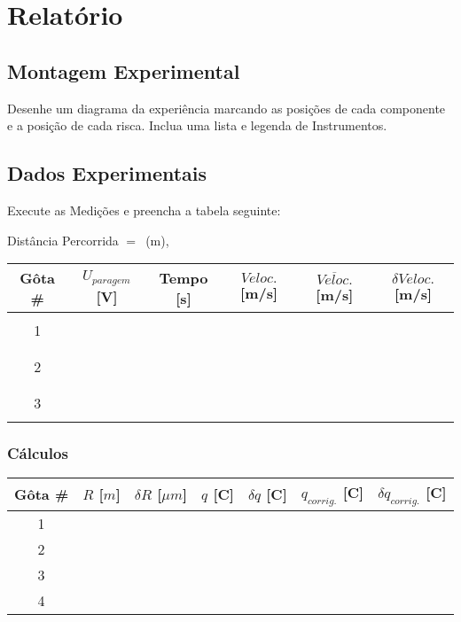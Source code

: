 \documentclass[a4paper,12pt]{article}  %
\begin{document}
\section{\sf Relatório}
\subsection{\sf Montagem Experimental}
Desenhe um diagrama da experiência marcando as posições de cada componente e a posição de cada risca. Inclua uma lista e legenda de Instrumentos.

\begin{center}
\framebox[18cm]{\rule{0pt}{6.5cm}}
\end{center}

\subsection{\sf Dados Experimentais}

 Execute as Medições e preencha a tabela seguinte:

\noindent  Distância Percorrida $=$~\underline{\makebox[1cm][r]{~}}(m), 

\begin{center}
	\begin{tabular}{|c|c|c|c|c|c|}
	\hline
	Gôta \#  & $U_{paragem}$ [V] & Tempo [s] & $Veloc.$  [m/s]& $\overline{Veloc.}$ [m/s]	& $\delta Veloc.$ [m/s]  \\
	\hline
	  &  &  & &  & \\ \cline{2-4}
	1 &  & & &  & \\ \cline{2-4}
	  &  &  & &  & \\  \hline
	  &  &  & &  & \\ \cline{2-4}
	2 &  & & &  & \\ \cline{2-4}
	  &  &  & &  & \\ \hline
	  &  &  & &  & \\ \cline{2-4}
	3 &  & & &  & \\ \cline{2-4}
	  &  &  & &  & \\ \hline
 	\end{tabular}
\end{center}

\subsubsection{\sf Cálculos}

\begin{center}
	\renewcommand{\arraystretch}{1.5}
	\begin{tabular}{|c|c|c|c|c|c|c|}
	\hline
	Gôta \#  & $R$ [$m$] & $\delta R$  [$\mu m$] & $q$ [C] & $\delta q$ [C] & $q_{corrig.}$ [C] & $\delta q_{corrig.}$ [C] \\ \hline
	 1 & &  &  & &  &  \\ \hline
	 2 & &  &  & &  & \\ \hline
	 3 & &  &  & &  & \\ \hline
	 4 & &  &  & &  & \\ \hline
 	\end{tabular}
\end{center}
\end{document}
